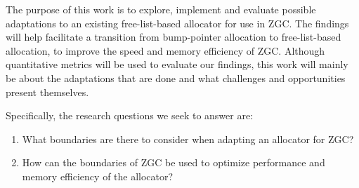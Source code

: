 
The purpose of this work is to explore, implement and evaluate possible adaptations to an existing free-list-based allocator for use in ZGC. The findings will help facilitate a transition from bump-pointer allocation to free-list-based allocation, to improve the speed and memory efficiency of ZGC. Although quantitative metrics will be used to evaluate our findings, this work will mainly be about the adaptations that are done and what challenges and opportunities present themselves.

Specifically, the research questions we seek to answer are:

\begin{enumerate}
    \item What boundaries are there to consider when adapting an allocator for ZGC?
    \item How can the boundaries of ZGC be used to optimize performance and memory efficiency of the allocator?
\end{enumerate}


